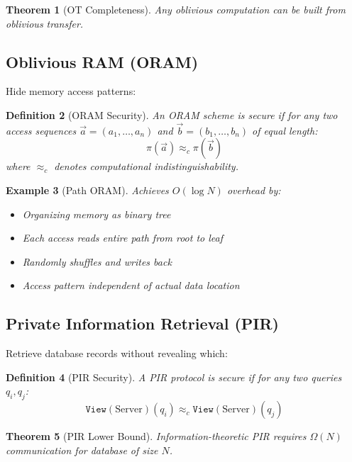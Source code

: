 \documentclass[11pt,final,hidelinks]{article}
\newtheorem{theorem}{Theorem}[section]
\newtheorem{definition}[theorem]{Definition}
\newtheorem{example}[theorem]{Example}
\newcommand{\Pattern}[1]{\pi(#1)}
\newcommand{\View}[1]{\mathtt{View}(#1)}
\begin{document}
\begin{theorem}[OT Completeness]
Any oblivious computation can be built from oblivious transfer.
\end{theorem}

\subsection{Oblivious RAM (ORAM)}

Hide memory access patterns:

\begin{definition}[ORAM Security]
An ORAM scheme is secure if for any two access sequences $\vec{a} = (a_1, \ldots, a_n)$ and $\vec{b} = (b_1, \ldots, b_n)$ of equal length:
\begin{equation}
\Pattern{\vec{a}} \approx_c \Pattern{\vec{b}}
\end{equation}
where $\approx_c$ denotes computational indistinguishability.
\end{definition}

\begin{example}[Path ORAM]
Achieves $O(\log N)$ overhead by:
\begin{itemize}
    \item Organizing memory as binary tree
    \item Each access reads entire path from root to leaf
    \item Randomly shuffles and writes back
    \item Access pattern independent of actual data location
\end{itemize}
\end{example}

\subsection{Private Information Retrieval (PIR)}

Retrieve database records without revealing which:

\begin{definition}[PIR Security]
A PIR protocol is secure if for any two queries $q_i, q_j$:
\begin{equation}
\View{\text{Server}}(q_i) \approx_c \View{\text{Server}}(q_j)
\end{equation}
\end{definition}

\begin{theorem}[PIR Lower Bound]
Information-theoretic PIR requires $\Omega(N)$ communication for database of size $N$.
\end{theorem}
\end{document}
